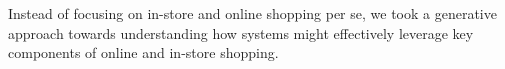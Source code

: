 

Instead of focusing on in-store and online shopping per se, we took a generative approach towards understanding how systems might effectively leverage key components of online and in-store shopping. 
